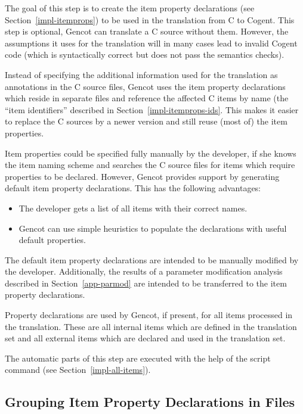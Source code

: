 The goal of this step is to create the item property declarations (see Section~\ref{impl-itemprops})
to be used in the translation from C to Cogent. This step is optional, Gencot can translate a C source 
without them. However, the assumptions it uses for the translation will in many cases lead to 
invalid Cogent code (which is syntactically correct but does not pass the semantics checks).

Instead of specifying the additional information used for the translation as annotations in the C source files,
Gencot uses the item property declarations which reside in separate files and reference the affected C 
items by name (the ``item identifiers'' described in Section~\ref{impl-itemprops-ids}. This makes it 
easier to replace the C sources by a newer version and still reuse (most of) the item properties.

Item properties could be specified fully manually by the developer, if she knows the item naming scheme
and searches the C source files for items which require properties to be declared. However, Gencot provides
support by generating default item property declarations. This has the following advantages:
\begin{itemize}
\item The developer gets a list of all items with their correct names.
\item Gencot can use simple heuristics to populate the declarations with useful default properties.
\end{itemize}

The default item property declarations are intended to be manually modified by the developer. Additionally, the 
results of a parameter modification analysis described in Section~\ref{app-parmod} are intended to be transferred
to the item property declarations.

Property declarations are used by Gencot, if present, for all items processed in the translation. These are all internal items 
which are defined in the translation set and all external items which are declared and used in the translation set.

The automatic parts of this step are executed with the help of the script command  (see 
Section~\ref{impl-all-items}).

\subsection{Grouping Item Property Declarations in Files}
\label{app-items-files}

